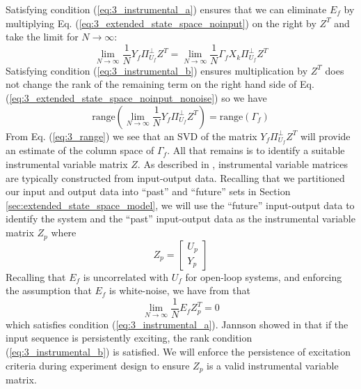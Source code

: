 Satisfying condition (\ref{eq:3_instrumental_a}) ensures that we can eliminate $E_f$ by multiplying Eq. (\ref{eq:3_extended_state_space_noinput}) on the right by $Z^T$ and take the limit for $N\rightarrow\infty$:
\begin{equation}\label{eq:3_extended_state_space_noinput_nonoise}
\lim_{N\rightarrow\infty} \frac{1}{N}Y_f\Pi_{U_f}^\perp Z^T = \lim_{N\rightarrow\infty} \frac{1}{N}\Gamma_f X_k\Pi_{U_f}^\perp Z^T
\end{equation}
 Satisfying condition (\ref{eq:3_instrumental_b}) ensures multiplication by $Z^T$ does not change the rank of the remaining term on the right hand side of Eq. (\ref{eq:3_extended_state_space_noinput_nonoise}) so we have
\begin{equation}\label{eq:3_range}
\mbox{range}\left(\lim_{N\rightarrow\infty} \frac{1}{N} Y_f\Pi_{U_f}^\perp Z^T\right) = \mbox{range}\left(\Gamma_f\right)
\end{equation}
From Eq. (\ref{eq:3_range}) we see that an SVD of the matrix $Y_f\Pi_{U_f}^\perp Z^T$  will provide an estimate of the column space of $\Gamma_f$. All that remains is to identify a suitable instrumental variable matrix $Z$. As described in \cite{soderstrom1983instrumental, verhaegen2007filtering}, instrumental variable matrices are typically constructed from input-output data. Recalling that we partitioned our input and output data into ``past'' and ``future'' sets in Section \ref{sec:extended_state_space_model}, we will use the ``future'' input-output data to identify the system and the ``past'' input-output data as the instrumental variable matrix $Z_p$ where
\begin{equation*}
Z_p = \begin{bmatrix}U_p\\ Y_p\end{bmatrix}
\end{equation*}
Recalling that $E_f$ is uncorrelated with $U_f$ for open-loop systems, and enforcing the assumption that $E_f$ is white-noise, we have from \cite{verhaegen2007filtering} that 
\begin{equation*}
\lim_{N\rightarrow\infty} \frac{1}{N} E_f Z_p^T = 0
\end{equation*}
which satisfies condition (\ref{eq:3_instrumental_a}). Jannson showed in \cite{jansson1997subspace} that if the input sequence is persistently exciting, the rank condition (\ref{eq:3_instrumental_b}) is satisfied. We will enforce the persistence of excitation criteria during experiment design to ensure $Z_p$ is a valid instrumental variable matrix.

